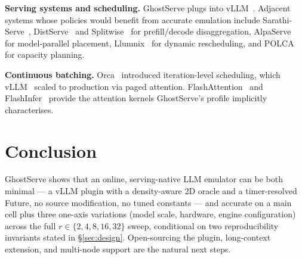 \documentclass[conference]{IEEEtran}
\newcommand{\sysname}{GhostServe}
\begin{document}
\textbf{Serving systems and scheduling.} \sysname{} plugs into
vLLM~\cite{kwon2023vllm}. Adjacent systems whose policies would
benefit from accurate emulation include
Sarathi-Serve~\cite{agrawal2024sarathi},
DistServe~\cite{zhong2024distserve} and
Splitwise~\cite{patel2024splitwise} for prefill/decode
disaggregation, AlpaServe~\cite{li2023alpaserve} for model-parallel
placement, Llumnix~\cite{sun2024llumnix} for dynamic rescheduling,
and POLCA~\cite{patel2024polca} for capacity planning.

\textbf{Continuous batching.} Orca~\cite{yu2022orca} introduced
iteration-level scheduling, which vLLM~\cite{kwon2023vllm} scaled to
production via paged attention.
FlashAttention~\cite{dao2022flashattention} and
FlashInfer~\cite{ye2025flashinfer} provide the attention kernels
\sysname{}'s profile implicitly characterises.

\section{Conclusion}
\label{sec:conclusion}

\sysname{} shows that an online, serving-native LLM emulator
can be both minimal --- a vLLM plugin with a density-aware 2D
oracle and a timer-resolved Future, no source modification, no
tuned constants --- and accurate on a main cell plus three
one-axis variations (model scale, hardware, engine
configuration) across the full $r\in\{2,4,8,16,32\}$ sweep,
conditional on two reproducibility invariants stated in
\S\ref{sec:design}. Open-sourcing the plugin, long-context
extension, and multi-node support are the natural next steps.



\end{document}
